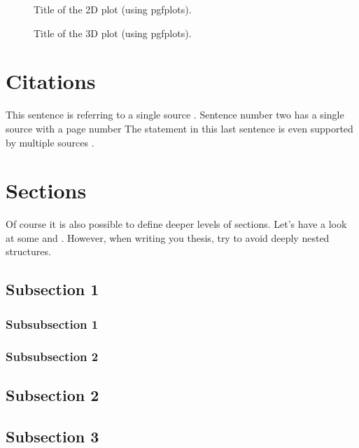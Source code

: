 \begin{figure}[htb]%
    \centering%
    \caption{Title of the 2D plot (using pgfplots).}%
    \label{fig:PlotTwoDim}%
\end{figure}%
%
\begin{figure}[htb]%
    \centering%
    \caption{Title of the 3D plot (using pgfplots).}%
    \label{fig:PlotThreeDim}%
\end{figure}%

\section{Citations}

This sentence is referring to a single source \cite{besl1992method}.
Sentence number two has a single source with a page number \cite[page 123f.]{chen1992object}
The statement in this last sentence is even supported by multiple sources \cite{choset2005principles, thrun2005probabilistic}.

\section{Sections}%

Of course it is also possible to define deeper levels of sections. Let's have a look at some  and .
However, when writing you thesis, try to avoid deeply nested structures.
%
\subsection{Subsection 1}%
\blindtext%
%
\subsubsection{Subsubsection 1}%
\blindtext%
%
\subsubsection{Subsubsection 2}%
\blindtext%
%
\subsection{Subsection 2}%
\blindtext%
%
\subsection{Subsection 3}%
\blindtext%
%
